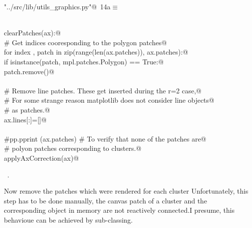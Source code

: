 \documentclass[11.5pt]{report}
\begin{document}
\begin{flushleft} \small\label{scrap3}\raggedright\small
{} \verb@"../src/lib/utils_graphics.py"@\nobreak\ {\footnotesize {14a}}$\equiv$
\vspace{-1ex}
\begin{list}{}{} \item
\mbox{}\verb@@\\
\mbox{}\verb@def clearPatches(ax):@\\
\mbox{}\verb@    # Get indices cooresponding to the polygon patches@\\
\mbox{}\verb@    for index , patch in zip(range(len(ax.patches)), ax.patches):@\\
\mbox{}\verb@        if isinstance(patch, mpl.patches.Polygon) == True:@\\
\mbox{}\verb@            patch.remove()@\\
\mbox{}\verb@@\\
\mbox{}\verb@    # Remove line patches. These get inserted during the r=2 case,@\\
\mbox{}\verb@    # For some strange reason matplotlib does not consider line objects@\\
\mbox{}\verb@    # as patches.@\\
\mbox{}\verb@    ax.lines[:]=[]@\\
\mbox{}\verb@@\\
\mbox{}\verb@    #pp.pprint (ax.patches) # To verify that none of the patches are@\\
\mbox{}\verb@    # polyon patches corresponding to clusters.@\\
\mbox{}\verb@    applyAxCorrection(ax)@\\
\mbox{}\verb@@{\NWsep}
\end{list}
\vspace{-1.5ex}
\footnotesize
\begin{list}{}{\setlength{\itemsep}{-\parsep}\setlength{\itemindent}{-\leftmargin}}
\item \NWtxtFileDefBy\ .

\item{}
\end{list}
\vspace{4ex}
\end{flushleft}
\newchunk Now remove the patches which were rendered for each cluster
    Unfortunately, this step has to be done manually, the canvas patch
    of a cluster and the corresponding object in memory are not reactively
    connected.I presume, this behavioue can be achieved by sub-classing.
\end{document}
